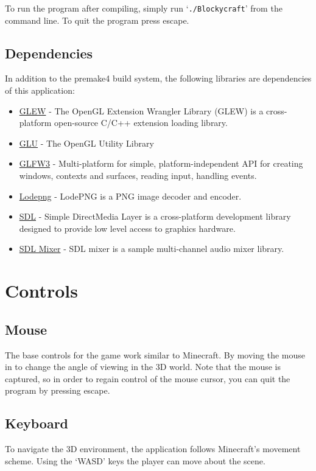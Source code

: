 \documentclass{book}
\begin{document}
To run the program after compiling, simply run `\texttt{./Blockycraft}' from the command line.  To quit the program press escape.


\subsection{Dependencies}
In addition to the premake4 build system, the following libraries are dependencies of this application: 
\begin{itemize}
	\item \href{https://github.com/nigels-com/glew}{GLEW} - The OpenGL Extension Wrangler Library (GLEW) is a cross-platform open-source C/C++ extension loading library.
	\item \href{https://www.opengl.org/resources/libraries/}{GLU} - The OpenGL Utility Library
	\item \href{http://www.glfw.org/docs/latest/}{GLFW3} - Multi-platform for simple, platform-independent API for creating windows, contexts and surfaces, reading input, handling events.
	\item \href{http://lodev.org/lodepng/}{Lodepng} - LodePNG is a PNG image decoder and encoder.
	\item \href{https://www.libsdl.org/}{SDL} - Simple DirectMedia Layer is a cross-platform development library designed to provide low level access to graphics hardware.
	\item \href{https://www.libsdl.org/projects/SDL_mixer/}{SDL Mixer} - SDL mixer is a sample multi-channel audio mixer library. 
\end{itemize}

\section{Controls}
\subsection{Mouse}
The base controls for the game work similar to Minecraft.  By moving the mouse in to change the angle of viewing in the 3D world.  Note that the mouse is captured, so in order to regain control of the mouse cursor, you can quit the program by pressing escape.

\subsection{Keyboard}
To navigate the 3D environment, the application follows Minecraft's movement scheme.  Using the `WASD' keys the player can move about the scene. 
\end{document}
